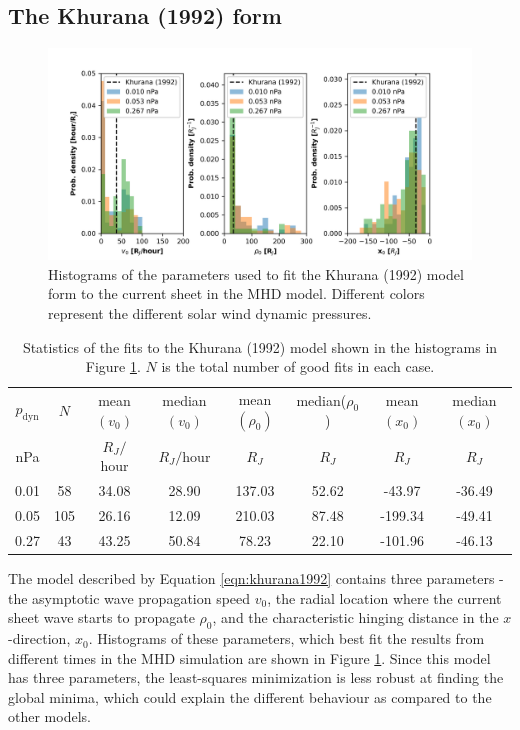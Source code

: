 \subsection{The Khurana (1992) form}
  
\begin{figure}
    \centering
    \includegraphics[width=\textwidth]{images5/comparison_highdynP_khurana.png}
    \caption{Histograms of the parameters used to fit the Khurana (1992) model form to the current sheet in the MHD model. Different colors represent the different solar wind dynamic pressures.}
    \label{fig:comparison-hist-khurana}
\end{figure}

\begin{table}
    \centering
    \begin{tabular}{c|c|c|c|c|c|c|c}
     $p_\text{dyn}$ &      $N$&  mean$(v_0)$&  median$(v_0)$&  mean$(\rho_0)$&    median($\rho_0$)& mean$(x_0)$&  median$(x_0)$\\
     nPa&   &   $R_J/$hour& $R_J/$hour& $R_J$   & $R_J$  &$R_J$  & $R_J$\\
     \hline
     0.01 &  58 &    34.08 &      28.90 &     137.03 &        52.62 &   -43.97 &     -36.49 \\
     0.05 & 105 &    26.16 &      12.09 &     210.03 &        87.48 &  -199.34 &     -49.41 \\
     0.27 &  43 &    43.25 &      50.84 &      78.23 &        22.10 &  -101.96 &     -46.13 \\
    \end{tabular}
    \caption{Statistics of the fits to the Khurana (1992) model shown in the histograms in Figure \protect\ref{fig:comparison-hist-khurana}. $N$ is the total number of good fits in each case.}
    \label{tab:comparison-khurana}
\end{table}

The model described by Equation \ref{eqn:khurana1992} contains three parameters - the asymptotic wave propagation speed $v_0$, the radial location where the current sheet wave starts to propagate $\rho_0$, and the characteristic hinging distance in the $x$-direction, $x_0$. Histograms of these parameters, which best fit the results from different times in the MHD simulation are shown in Figure \ref{fig:comparison-hist-khurana}. Since this model has three parameters, the least-squares minimization is less robust at finding the global minima, which could explain the different behaviour as compared to the other models. 

